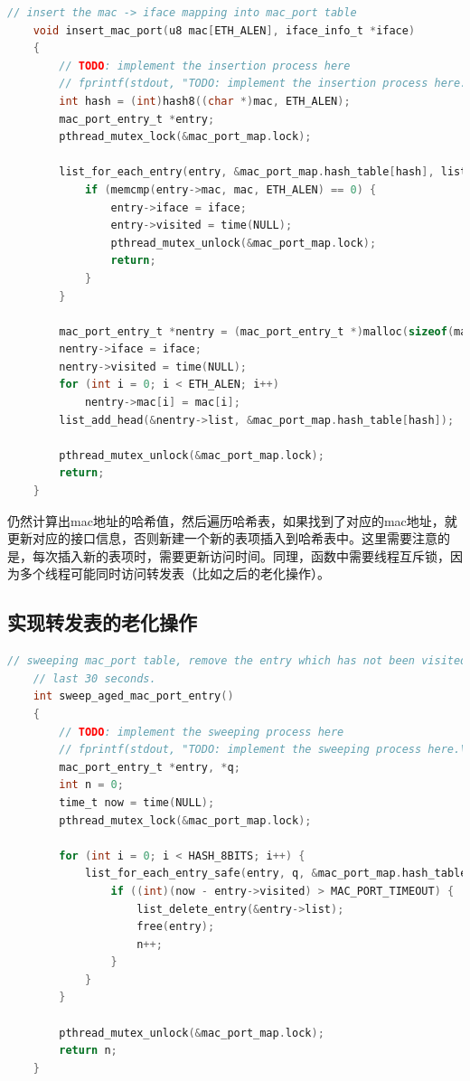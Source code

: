\documentclass[UTF8]{report}
\begin{document}
\begin{lstlisting}[language=C]
    // insert the mac -> iface mapping into mac_port table
    void insert_mac_port(u8 mac[ETH_ALEN], iface_info_t *iface)
    {
        // TODO: implement the insertion process here
        // fprintf(stdout, "TODO: implement the insertion process here.\n");
        int hash = (int)hash8((char *)mac, ETH_ALEN);
        mac_port_entry_t *entry;
        pthread_mutex_lock(&mac_port_map.lock);
    
        list_for_each_entry(entry, &mac_port_map.hash_table[hash], list) {
            if (memcmp(entry->mac, mac, ETH_ALEN) == 0) {
                entry->iface = iface;
                entry->visited = time(NULL);
                pthread_mutex_unlock(&mac_port_map.lock);
                return;
            }
        }
    
        mac_port_entry_t *nentry = (mac_port_entry_t *)malloc(sizeof(mac_port_entry_t));
        nentry->iface = iface;
        nentry->visited = time(NULL);
        for (int i = 0; i < ETH_ALEN; i++)
            nentry->mac[i] = mac[i];
        list_add_head(&nentry->list, &mac_port_map.hash_table[hash]);
    
        pthread_mutex_unlock(&mac_port_map.lock);
        return;
    }
\end{lstlisting}

仍然计算出mac地址的哈希值，然后遍历哈希表，如果找到了对应的mac地址，就更新对应的接口信息，否则新建一个新的表项插入到哈希表中。这里需要注意的是，每次插入新的表项时，需要更新访问时间。同理，函数中需要线程互斥锁，因为多个线程可能同时访问转发表（比如之后的老化操作）。

\subsection{实现转发表的老化操作}

\begin{lstlisting}[language=C]
    // sweeping mac_port table, remove the entry which has not been visited in the
    // last 30 seconds.
    int sweep_aged_mac_port_entry()
    {
        // TODO: implement the sweeping process here
        // fprintf(stdout, "TODO: implement the sweeping process here.\n");
        mac_port_entry_t *entry, *q;
        int n = 0;
        time_t now = time(NULL);
        pthread_mutex_lock(&mac_port_map.lock);
        
        for (int i = 0; i < HASH_8BITS; i++) {
            list_for_each_entry_safe(entry, q, &mac_port_map.hash_table[i], list) {
                if ((int)(now - entry->visited) > MAC_PORT_TIMEOUT) {
                    list_delete_entry(&entry->list);
                    free(entry);
                    n++;
                }
            }
        }
    
        pthread_mutex_unlock(&mac_port_map.lock);
        return n;
    }
\end{lstlisting}
\end{document}
